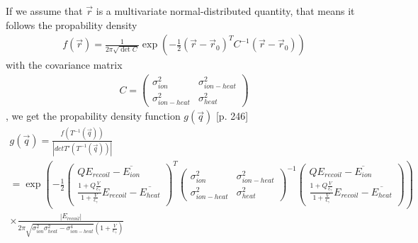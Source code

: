 \documentclass[10pt, a4paper]{article}
\begin{document}
If we assume that $\vec{r}$ is a multivariate normal-distributed quantity, that means it follows the propability density
\begin{gather}
f(\vec{r}) = \frac{1}{2 \pi \sqrt{\det C}} \exp \left( - \frac{1}{2} (\vec{r} - \vec{r}_0)^T C^{-1} (\vec{r} - \vec{r}_0) \right)
\end{gather}
with the covariance matrix
\begin{gather}
C = \begin{pmatrix} \sigma_{ion}^2 & \sigma_{ion-heat}^2 \\ \sigma_{ion-heat}^2 & \sigma_{heat}^2 \end{pmatrix}
\end{gather}
, we get the propability density function $g(\vec{q})$ \cite{Henze}[p. 246]
\begin{gather}
g(\vec{q}) = \frac{f(T^{-1}(\vec{q}))}{\left| det T'(T^{-1}(\vec{q})) \right|} \\ =  \exp \left( - \frac{1}{2}  \begin{pmatrix} Q E_{recoil} - \overline{E_{ion}}\\ \frac{1 + Q \frac{V}{\epsilon_\gamma}}{1 + \frac{V}{\epsilon_\gamma}} E_{recoil} - \overline{E_{heat}} \end{pmatrix}^T \begin{pmatrix} \sigma_{ion}^2 & \sigma_{ion-heat}^2 \\ \sigma_{ion-heat}^2 & \sigma_{heat}^2 \end{pmatrix}^{-1} \begin{pmatrix} Q E_{recoil} - \overline{E_{ion}} \\ \frac{1 + Q \frac{V}{\epsilon_\gamma}}{1 + \frac{V}{\epsilon_\gamma}} E_{recoil} - \overline{E_{heat}} \end{pmatrix} \right) \\
\times  \frac{\left| E_{recoil} \right| }{2 \pi \sqrt{\sigma_{ion}^2 \sigma_{heat}^2 - \sigma_{ion-heat}^4} \left(1 + \frac{V}{\epsilon_\gamma}\right)} \label{propfunc}
\end{gather} 
\end{document}
